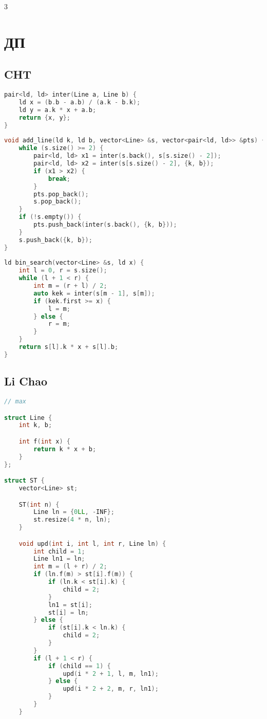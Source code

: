 \documentclass[10pt,a4paper,landscape,twosided]{extarticle}
\begin{document}
\begin{multicols*}{3}
\section{ДП}

\subsection{CHT}
\begin{lstlisting}[language=C++]
pair<ld, ld> inter(Line a, Line b) {
    ld x = (b.b - a.b) / (a.k - b.k);
    ld y = a.k * x + a.b;
    return {x, y};
}
 
void add_line(ld k, ld b, vector<Line> &s, vector<pair<ld, ld>> &pts) {
    while (s.size() >= 2) {
        pair<ld, ld> x1 = inter(s.back(), s[s.size() - 2]);
        pair<ld, ld> x2 = inter(s[s.size() - 2], {k, b});
        if (x1 > x2) {
            break;
        }
        pts.pop_back();
        s.pop_back();
    }
    if (!s.empty()) {
        pts.push_back(inter(s.back(), {k, b}));
    }
    s.push_back({k, b});
}
 
ld bin_search(vector<Line> &s, ld x) {
    int l = 0, r = s.size();
    while (l + 1 < r) {
        int m = (r + l) / 2;
        auto kek = inter(s[m - 1], s[m]);
        if (kek.first >= x) {
            l = m;
        } else {
            r = m;
        }
    }
    return s[l].k * x + s[l].b;
}

\end{lstlisting}

\subsection{Li Chao}
\begin{lstlisting}[language=C++]
// max

struct Line {
    int k, b;

    int f(int x) {
        return k * x + b;
    }
};

struct ST {
    vector<Line> st;

    ST(int n) {
        Line ln = {0LL, -INF};
        st.resize(4 * n, ln);
    }

    void upd(int i, int l, int r, Line ln) {
        int child = 1;
        Line ln1 = ln;
        int m = (l + r) / 2;
        if (ln.f(m) > st[i].f(m)) {
            if (ln.k < st[i].k) {
                child = 2;
            }
            ln1 = st[i];
            st[i] = ln;
        } else {
            if (st[i].k < ln.k) {
                child = 2;
            }
        }
        if (l + 1 < r) {
            if (child == 1) {
                upd(i * 2 + 1, l, m, ln1);
            } else {
                upd(i * 2 + 2, m, r, ln1);
            }
        }
    }


\end{lstlisting}
\end{multicols*}
\end{document}
